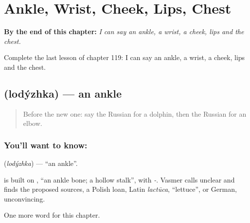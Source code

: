 
\chapter{Ankle, Wrist, Cheek, Lips, Chest}
\label{ch:ru-ankle-wrist-cheek-lips-chest}

\begin{chapteropening}
\textbf{By the end of this chapter:} \emph{I can say an ankle, a wrist, a cheek, lips and the chest.}

Complete the last lesson of chapter 119: I can say an ankle, a wrist, a cheek, lips and the chest.
\end{chapteropening}

\section[\texorpdfstring{\ru{лодыжка} (lodýzhka)}{лодыжка (lodýzhka)}]{ (lodýzhka) — an ankle}

\label{lesson:RU-C119-ankle}



\begin{quote}
Before the new one: say the Russian for a dolphin, then the Russian for an elbow.
\end{quote}

\subsection*{You'll want to know: }
\textbf{} (\emph{lodýzhka}) — \textquotedblleft{}an ankle\textquotedblright{}.

\begin{cousinweb}
\textbf{} is built on \emph{}, \textquotedblleft{}an ankle bone; a hollow stalk\textquotedblright{}, with \emph{-}. Vasmer calls \emph{} unclear and finds the proposed sources, a Polish loan, Latin \emph{lactūca}, \textquotedblleft{}lettuce\textquotedblright{}, or German, unconvincing.
\end{cousinweb}

\begin{grammarlens}[title={What you've built}]
One more word for this chapter.
\end{grammarlens}

